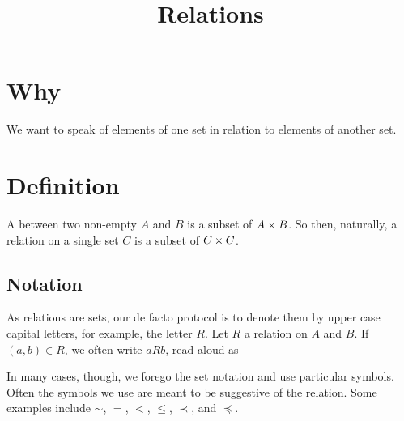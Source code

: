 







\title{Relations}

\section{Why}
We want to speak of elements of one set in relation to elements of another set.

\section{Definition}

A  between two non-empty  $A$ and $B$ is a subset of $A \times B$.
So then, naturally, a relation on a single set $C$ is a subset of $C \times C$.

\subsection{Notation}
As relations are sets, our de facto protocol is to denote them by upper case capital letters, for example, the letter $R$.
Let $R$ a relation on $A$ and $B$.
If $(a, b) \in R$, we often write $a R b$, read aloud as 

In many cases, though, we forego the set notation and use particular symbols.
Often the symbols we use are meant to be suggestive of the relation.
Some examples include $\sim$, $=$, $<$, $\leq$, $\prec$, and $\preceq$.


